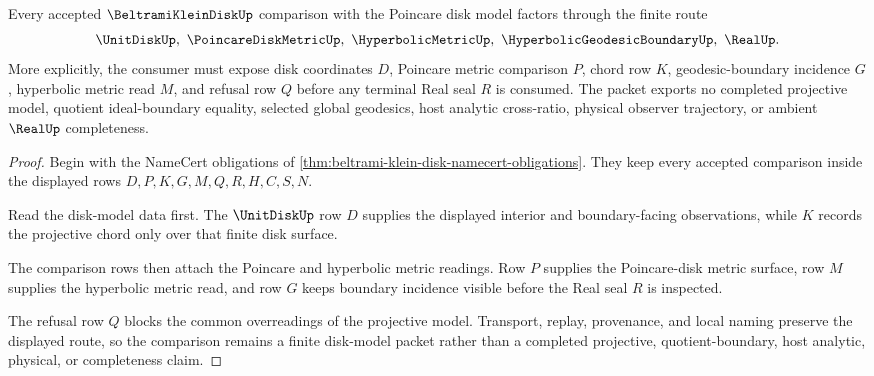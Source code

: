 \begin{theorem}
\label{thm:beltrami-klein-disk-poincare-comparison-route}
Every accepted $\BeltramiKleinDiskUp$ comparison with the Poincare disk model factors through the finite route
$$
\UnitDiskUp,\ \PoincareDiskMetricUp,\ \HyperbolicMetricUp,\ \HyperbolicGeodesicBoundaryUp,\ \RealUp .
$$
More explicitly, the consumer must expose disk coordinates $D$, Poincare metric comparison $P$, chord row $K$, geodesic-boundary incidence $G$, hyperbolic metric read $M$, and refusal row $Q$ before any terminal Real seal $R$ is consumed. The packet exports no completed projective model, quotient ideal-boundary equality, selected global geodesics, host analytic cross-ratio, physical observer trajectory, or ambient $\RealUp$ completeness.
\end{theorem}
\begin{proof}
Begin with the NameCert obligations of \autoref{thm:beltrami-klein-disk-namecert-obligations}. They keep every accepted comparison inside the displayed rows $D,P,K,G,M,Q,R,H,C,S,N$.

Read the disk-model data first. The $\UnitDiskUp$ row $D$ supplies the displayed interior and boundary-facing observations, while $K$ records the projective chord only over that finite disk surface.

The comparison rows then attach the Poincare and hyperbolic metric readings. Row $P$ supplies the Poincare-disk metric surface, row $M$ supplies the hyperbolic metric read, and row $G$ keeps boundary incidence visible before the Real seal $R$ is inspected.

The refusal row $Q$ blocks the common overreadings of the projective model. Transport, replay, provenance, and local naming preserve the displayed route, so the comparison remains a finite disk-model packet rather than a completed projective, quotient-boundary, host analytic, physical, or completeness claim.
\end{proof}



